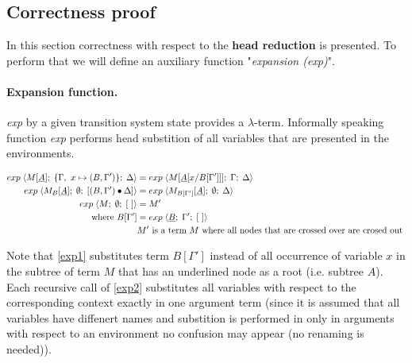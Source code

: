 \documentclass[a4paper, 10pt]{article}
\begin{document}
\subsection{Correctness proof}
In this section correctness with respect to the \textbf{head reduction} is presented.
To perform that we will define an auxiliary function "\emph{expansion (exp)}".

\paragraph{Expansion function.} 
\emph{exp} by a given transition system state provides a $\lambda$-term.
Informally speaking function \emph{exp} performs head substition of all
variables that are presented in the environments.

\begin{align}
  \label{exp1} exp\; \langle M[\underline{A}];\; \{\Gamma,\ x \mapsto (B, \Gamma')\};\; \Delta \rangle
  &= exp\; \langle M[\underline{A}[x / B[\Gamma']]];\; \Gamma;\; \Delta \rangle \\
  \label{exp2} exp\; \langle M_B[\underline{A}];\; \emptyset;\; [(B,\Gamma')\bullet\Delta] \rangle
  &= exp\; \langle M_{B[\Gamma']}[\underline{A}];\; \emptyset;\; \Delta \rangle\\
  \label{exp3} exp\; \langle M;\; \emptyset;\; [\ ] \rangle &= M' \\
  \textnormal{where } B[\Gamma'] &= exp\; \langle \underline{B};\; \Gamma';\; [\ ] \rangle \\
  & M' \textnormal{ is a term } M \textnormal{ where all nodes that are crossed over are crosed out }
\end{align}

Note that \eqref{exp1} substitutes term $B[\Gamma']$ instead of all occurrence of variable $x$ in the subtree of term $M$ that has an underlined node as a root (i.e. subtree $A$). Each recursive call of \eqref{exp2} substitutes all variables with respect to the corresponding context exactly in one argument term (since it is assumed that all variables have diffenert names and
substition is performed in only in arguments with respect to an environment no confusion may appear (no renaming is needed)).
\end{document}
